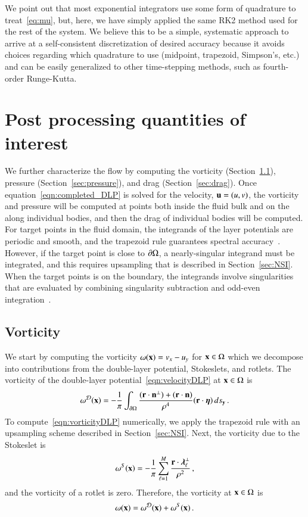 \documentclass[preprint, 10pt]{elsarticle}
\begin{document}
We point out that most exponential integrators use some form of quadrature to treat~\eqref{eq:mu}, but, here, we have simply applied the same RK2 method used for the rest of the system. We believe this to be a simple, systematic approach to arrive at a self-consistent discretization of desired accuracy because it avoids choices regarding which quadrature to use (midpoint, trapezoid, Simpson's, etc.) and can be easily generalized to other time-stepping methods, such as fourth-order Runge-Kutta. 


\section{Post processing quantities of interest}
\label{s:qoi}
We further characterize the flow by computing the vorticity
(Section~\ref{sec:vorticity}), pressure (Section~\ref{sec:pressure}),
and drag (Section~\ref{sec:drag}).  Once
equation~\eqref{eqn:completed_DLP} is solved for the velocity, ${\mathbf{u}} =
(u,v)$, the vorticity and pressure will be computed at points both
inside the fluid bulk and on the along individual bodies, and then the
drag of individual bodies will be computed.  For target points in the
fluid domain, the integrands of the layer potentials are periodic and
smooth, and the trapezoid rule guarantees spectral
accuracy~\cite{tre-wei2014}.  However, if the target point is close to
${\partial} \Omega$, a nearly-singular integrand must be integrated, and this
requires upsampling that is described in Section~\ref{sec:NSI}.  When
the target points is on the boundary, the integrands involve
singularities that are evaluated by combining singularity subtraction
and odd-even integration~\cite{sid-isr1988}.  

\subsection{Vorticity}
\label{sec:vorticity}
We start by computing the vorticity $\omega({\mathbf{x}}) = v_x - u_y$ for ${\mathbf{x}} \in \Omega$ which we decompose into contributions from the double-layer potential, Stokeslets, and rotlets.  The vorticity of the double-layer potential~\eqref{eqn:velocityDLP} at ${\mathbf{x}} \in \Omega$ is
\begin{align}
  \omega^{{\mathcal{D}}}({\mathbf{x}}) = -\frac{1}{\pi}\int_{{\partial}\Omega} 
    \frac{({\mathbf{r}} \cdot {\mathbf{n}}^\perp) + ({\mathbf{r}} \cdot {\mathbf{n}})}{\rho^4}
    ({\mathbf{r}} \cdot {\boldsymbol\eta}) \, ds_{{\mathbf{y}}}\, .
  \label{eqn:vorticityDLP}
\end{align}
To compute~\eqref{eqn:vorticityDLP} numerically, we apply the trapezoid rule with an upsampling scheme described in Section~\ref{sec:NSI}.  Next, the vorticity due to the Stokeslet is
\begin{align}
  \omega^S({\mathbf{x}}) = -\frac{1}{\pi} \sum_{\ell=1}^{M} 
    \frac{{\mathbf{r}} \cdot {\boldsymbol\lambda}_\ell^\perp}{\rho^2}\, ,
\end{align}
and the vorticity of a rotlet is zero.  Therefore, the vorticity at ${\mathbf{x}}
\in \Omega$ is
\begin{align}
  \omega({\mathbf{x}}) = \omega^{\mathcal{D}}({\mathbf{x}}) + \omega^S({\mathbf{x}})\, .
\end{align}
\end{document}
